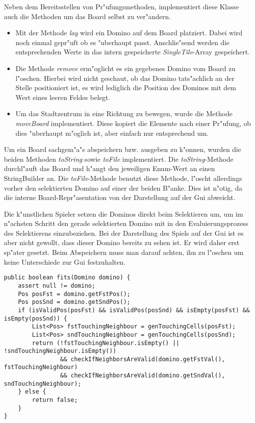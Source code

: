 Neben dem Bereitsstellen von Pr"ufungsmethoden, implementiert diese Klasse auch die Methoden um das Board selbst zu ver"andern. 
\begin{itemize}
	\item Mit der Methode \emph{lay} wird ein Domino auf dem Board platziert. Dabei wird noch einmal gepr"uft ob es "uberhaupt passt. Anschlie"send werden die entsprechenden Werte in das intern gespeicherte \emph{SingleTile}-Array gespeichert. 
	\item Die Methode \emph{remove} erm"oglicht es ein gegebenes Domino vom Board zu l"oschen. Hierbei wird nicht geschaut, ob das Domino tats"achlich an der Stelle positioniert ist, es wird lediglich die Position des Dominos mit dem Wert eines leeren Feldes belegt. 
	\item Um das Stadtzentrum in eine Richtung zu bewegen, wurde die Methode \emph{moveBoard} implementiert. Diese kopiert die Elemente nach einer Pr"ufung, ob dies "uberhaupt m"oglich ist, aber einfach nur entsprechend um. 
\end{itemize}

Um ein Board sachgem"a"s abspeichern bzw. ausgeben zu k"onnen, wurden die beiden Methoden \emph{toString} sowie \emph{toFile} implementiert. Die \emph{toString}-Methode durchl"auft das Board und h"angt den jeweiligen Enum-Wert an einen StringBuilder an. Die \emph{toFile}-Methode benutzt diese Methode, l"oscht allerdings vorher den selektierten Domino auf einer der beiden B"anke. Dies ist n"otig, da die interne Board-Repr"asentation von der Darstellung auf der Gui abweicht. 

Die k"unstlichen Spieler setzen die Dominos direkt beim Selektieren um, um im n"achsten Schritt den gerade selektierten Domino mit in den Evaluierungsprozess des Selektierens einzubeziehen. Bei der Darstellung des Spiels auf der Gui ist es aber nicht gewollt, dass dieser Domino bereits zu sehen ist. Er wird daher erst sp"ater gesetzt. Beim Abspeichern muss man darauf achten, ihn zu l"oschen um keine Unterschiede zur Gui festzuhalten. 
\begin{lstlisting}[float,style=CodeHighlighting,caption=Board - fits,label=lst:board_fits]
public boolean fits(Domino domino) {
    assert null != domino;
    Pos posFst = domino.getFstPos();
    Pos posSnd = domino.getSndPos();
    if (isValidPos(posFst) && isValidPos(posSnd) && isEmpty(posFst) && isEmpty(posSnd)) {
        List<Pos> fstTouchingNeighbour = genTouchingCells(posFst);
        List<Pos> sndTouchingNeighbour = genTouchingCells(posSnd);
        return (!fstTouchingNeighbour.isEmpty() || !sndTouchingNeighbour.isEmpty())
                && checkIfNeighborsAreValid(domino.getFstVal(), fstTouchingNeighbour)
                && checkIfNeighborsAreValid(domino.getSndVal(), sndTouchingNeighbour);
    } else {
        return false;
    }
}
\end{lstlisting}